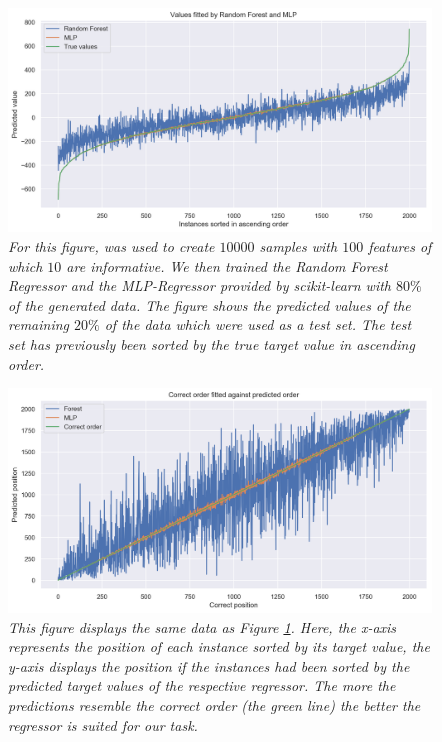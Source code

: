 	\begin{figure}[h]
		\centering
		\includegraphics[width=\linewidth]{images/mlp_forest_comparison01.png}
		\caption{\textit{For this figure, {\normalfont {}} was used to create $10000$ samples with $100$ features of which $10$ are informative. We then trained the Random Forest Regressor and the MLP-Regressor provided by {\normalfont scikit-learn} with $80\%$ of the generated data. The figure shows the predicted values of the remaining $20\%$ of the data which were used as a test set. The test set has previously been sorted by the true target value in ascending order.}}
		\label{forest_mlp_comp1}
	\end{figure}
	\begin{figure}[h]
		\centering
		\includegraphics[width=\linewidth]{images/mlp_forest_comparison02.png}
		\caption{\textit{This figure displays the same data as Figure \ref{forest_mlp_comp1}. Here, the x-axis represents the position of each instance sorted by its target value, the y-axis displays the position if the instances had been sorted by the predicted target values of the respective regressor. The more the predictions resemble the correct order (the green line) the better the regressor is suited for our task.}}
		\label{forest_mlp_comp2}
	\end{figure}

